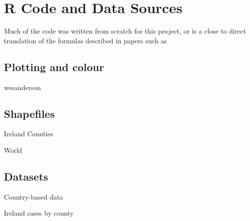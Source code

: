\section{R Code and Data Sources}
\label{ch:codesource}

Much of the code was written from scratch for this peoject, or is a close to direct translation of the formulas described in papers such as %

\subsection{Plotting and colour}

wesanderson \cite{wesanderson20}

\subsection{Shapefiles}

Ireland Counties \cite{countyshape}

World \cite{countryshape}

\subsection{Datasets}

Country-based data \cite{countrydata}

Ireland cases by county \cite{irelanddata}